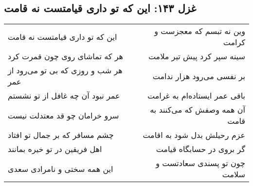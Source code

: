 \begin{center}
\section*{غزل ۱۴۳: این که تو داری قیامتست نه قامت}
\label{sec:143}
\begin{longtable}{l p{0.5cm} r}
این که تو داری قیامتست نه قامت
&&
وین نه تبسم که معجزست و کرامت
\\
هر که تماشای روی چون قمرت کرد
&&
سینه سپر کرد پیش تیر ملامت
\\
هر شب و روزی که بی تو می‌رود از عمر
&&
بر نفسی می‌رود هزار ندامت
\\
عمر نبود آن چه غافل از تو نشستم
&&
باقی عمر ایستاده‌ام به غرامت
\\
سرو خرامان چو قد معتدلت نیست
&&
آن همه وصفش که می‌کنند به قامت
\\
چشم مسافر که بر جمال تو افتاد
&&
عزم رحیلش بدل شود به اقامت
\\
اهل فریقین در تو خیره بمانند
&&
گر بروی در حسابگاه قیامت
\\
این همه سختی و نامرادی سعدی
&&
چون تو پسندی سعادتست و سلامت
\\
\end{longtable}
\end{center}
